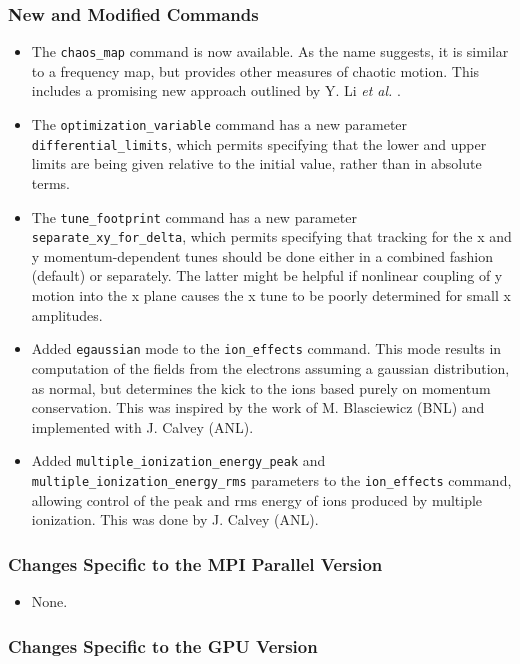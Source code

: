 \documentclass[11pt]{article}
\begin{document}
\subsubsection{New and Modified Commands}
\begin{itemize}
\item The \verb|chaos_map| command is now available. As the name suggests, it is similar to
  a frequency map, but provides other measures of chaotic motion. This includes a promising new
  approach outlined by Y. Li {\em et al.} \cite{Li-arxiv-1912.00121}.
\item The \verb|optimization_variable| command has a new parameter \verb|differential_limits|, which 
  permits specifying that the lower and upper limits are being given relative to the initial value,
  rather than in absolute terms.
\item The \verb|tune_footprint| command has a new parameter \verb|separate_xy_for_delta|, which permits
  specifying that tracking for the x and y momentum-dependent tunes should be done either in a combined 
  fashion (default) or separately. The latter might be helpful if nonlinear coupling of y motion into the x plane
  causes the x tune to be poorly determined for small x amplitudes.
\item Added \verb|egaussian| mode to the \verb|ion_effects| command. This mode results in computation of the fields
  from the electrons assuming a gaussian distribution, as normal, but determines the kick to the ions based purely on
  momentum conservation. This was inspired by the work of M. Blasciewicz (BNL) and implemented with J. Calvey (ANL).
\item Added \verb|multiple_ionization_energy_peak| and \verb|multiple_ionization_energy_rms| parameters to 
  the \verb|ion_effects| command, allowing control of the peak and rms energy of ions produced by multiple ionization.
  This was done by J. Calvey (ANL).
\end{itemize}

\subsubsection{Changes Specific to the MPI Parallel Version}

\begin{itemize}
\item None.
\end{itemize}

\subsubsection{Changes Specific to the GPU Version}
\end{document}
